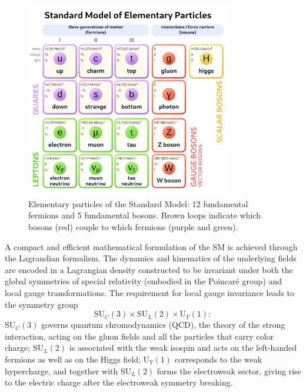\begin{figure}[!htb]
\begin{center}
\includegraphics[width=0.8\textwidth]{figures/standard_model.png}\caption{Elementary particles of the Standard Model: 12 fundamental fermions and 5 fundamental bosons. Brown loops indicate which bosons (red) couple to which fermions (purple and green).}
\label{fig:smcontent}
\end{center}
\end{figure}

A compact and efficient mathematical formulation of the SM is achieved through the Lagrandian formalism. The dynamics and kinematics of the underlying fields are encoded in a Lagrangian density constructed to be invariant under both the global symmetries of special relativity (embodied in the Poincaré group) and local gauge transformations. The requirement for local gauge invariance leads to the symmetry group
\begin{equation}
\mathrm{SU}_C(3) \times \mathrm{SU}_L(2) \times \mathrm{U}_Y(1):
\label{SM_symmetry_group}
\end{equation}
$\mathrm{SU}_C(3)$ governs quantum chromodynamics (QCD), the theory of the strong interaction, acting on the gluon fields and all the particles that carry color charge; $\mathrm{SU}_L(2)$ is associated with the weak isospin and acts on the left-handed fermions as well as on the Higgs field; $\mathrm{U}_Y(1)$ corresponds to the weak hypercharge, and together with $\mathrm{SU}_L(2)$ forms the electroweak sector, giving rise to the electric charge after the electroweak symmetry breaking.

